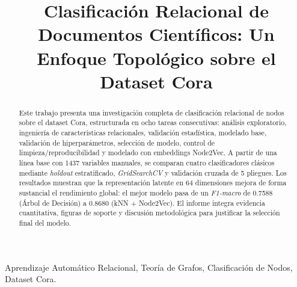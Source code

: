 \documentclass[conference,a4paper]{IEEEtran}
\begin{document}
\title{Clasificación Relacional de Documentos Científicos: Un Enfoque Topológico sobre el Dataset Cora}


\author{
  
  \and
  
}

\maketitle
\thispagestyle{plain} %
\pagestyle{plain}     %


\begin{abstract}
  Este trabajo presenta una investigación completa de clasificación relacional de nodos sobre el
  dataset Cora, estructurada en ocho tareas consecutivas: análisis exploratorio, ingeniería de
  características relacionales, validación estadística, modelado base, validación de
  hiperparámetros, selección de modelo, control de limpieza/reproducibilidad y modelado con
  embeddings Node2Vec. A partir de una línea base con 1437 variables manuales, se comparan cuatro
  clasificadores clásicos mediante \textit{holdout} estratificado, \textit{GridSearchCV} y
  validación cruzada de 5 pliegues. Los resultados muestran que la representación latente en 64
  dimensiones mejora de forma sustancial el rendimiento global: el mejor modelo pasa de un
  \textit{F1-macro} de 0.7588 (Árbol de Decisión) a 0.8680 (kNN + Node2Vec). El informe integra
  evidencia cuantitativa, figuras de soporte y discusión metodológica para justificar la selección
  final del modelo.
\end{abstract}


\begin{IEEEkeywords}
  Aprendizaje Automático Relacional, Teoría de Grafos, Clasificación de Nodos, Dataset Cora.
\end{IEEEkeywords}
\end{document}
